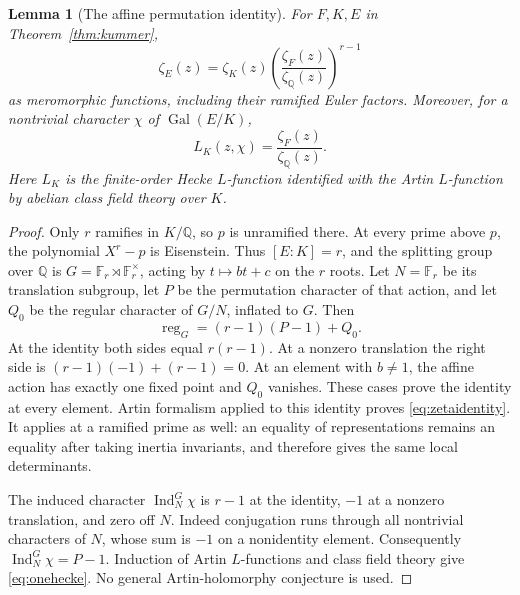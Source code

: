 \documentclass[11pt]{article}
\newcommand{\Q}{\mathbb Q}
\newcommand{\F}{\mathbb F}
\newcommand{\Gal}{\operatorname{Gal}}
\newtheorem{lemma}[theorem]{Lemma}
\theoremstyle{definition}
\theoremstyle{remark}
\begin{document}
\begin{lemma}[The affine permutation identity]\label{lem:affine}
For $F,K,E$ in Theorem~\ref{thm:kummer},
\begin{equation}\label{eq:zetaidentity}
 \zeta_E(z)=\zeta_K(z)
       \left(\frac{\zeta_F(z)}{\zeta_{\Q}(z)}\right)^{r-1}
\end{equation}
as meromorphic functions, including their ramified Euler factors.
Moreover, for a nontrivial character $\chi$ of $\Gal(E/K)$,
\begin{equation}\label{eq:onehecke}
 L_K(z,\chi)=\frac{\zeta_F(z)}{\zeta_{\Q}(z)}.
\end{equation}
Here $L_K$ is the finite-order Hecke $L$-function identified with
the Artin $L$-function by abelian class field theory over $K$.
\end{lemma}
\begin{proof}
Only $r$ ramifies in $K/\Q$, so $p$ is unramified there.
At every prime above $p$, the polynomial $X^r-p$ is Eisenstein.
Thus $[E:K]=r$, and the splitting group over $\Q$ is
$G=\F_r\rtimes\F_r^\times$, acting by $t\mapsto bt+c$ on the
$r$ roots.  Let $N=\F_r$ be its translation subgroup, let $P$ be
the permutation character of that action, and let $Q_0$ be the
regular character of $G/N$, inflated to $G$.  Then
\[
 \operatorname{reg}_G=(r-1)(P-1)+Q_0.
\]
At the identity both sides equal $r(r-1)$.  At a nonzero translation
the right side is $(r-1)(-1)+(r-1)=0$.  At an element with
$b\ne1$, the affine action has exactly one fixed point and
$Q_0$ vanishes.  These cases prove the identity at every element.
Artin formalism applied to this identity proves
\eqref{eq:zetaidentity}.  It applies at a ramified prime as well:
an equality of representations remains an equality after taking
inertia invariants, and therefore gives the same local determinants.

The induced character $\operatorname{Ind}_N^G\chi$ is $r-1$
at the identity, $-1$ at a nonzero translation, and zero off $N$.
Indeed conjugation runs through all nontrivial characters of $N$,
whose sum is $-1$ on a nonidentity element.  Consequently
$\operatorname{Ind}_N^G\chi=P-1$.
Induction of Artin $L$-functions and class field theory give
\eqref{eq:onehecke}.  No general Artin-holomorphy conjecture is used.
\end{proof}
\end{document}
